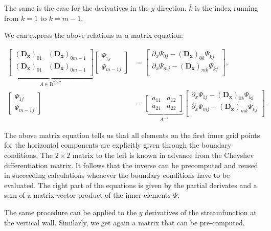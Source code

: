 The same is the case for the derivatives in the $y$ direction. $\bar{k}$ is the
index running from $k=1$ to $k=m-1$.

We can express the above relations as a matrix equation:

\begin{align}
\underbrace{\begin{bmatrix} (\mathbf{D_x})_{01} & (\mathbf{D_x})_{0m-1} \\
    (\mathbf{D_x})_{01} & (\mathbf{D_x})_{0m-1} \\
\end{bmatrix}}_{A \in \mathrm{R}^{2 \times 2}}
\begin{bmatrix} \Psi_{1j} \\ \Psi_{m-1j}
\end{bmatrix} &=
\begin{bmatrix}
\partial_x\Psi_{0j} - (\mathbf{D_x})_{0\bar{k}}\Psi_{\bar{k}j} \\
\partial_x\Psi_{mj} - (\mathbf{D_x})_{m\bar{k}}\Psi_{\bar{k}j} \\
\end{bmatrix}, \nonumber \\
\begin{bmatrix} \Psi_{1j} \\ \Psi_{m-1j}
\end{bmatrix} &=
\underbrace{\begin{bmatrix} a_{11} & a_{12} \\ a_{21} & a_{22} 
\end{bmatrix}}_{A^{-1}}
\begin{bmatrix}
\partial_x\Psi_{1j} - (\mathbf{D_x})_{0\bar{k}}\Psi_{\bar{k}j} \\
\partial_x\Psi_{mj} - (\mathbf{D_x})_{m\bar{k}}\Psi_{\bar{k}j} \\
\end{bmatrix}.
\label{eq:mat1}
\end{align}

The above matrix equation tells us that all elements on the first inner grid
points for the horizontal components are explicitly given through the boundary
conditions. The $2 \times 2$ matrix to the left is known in advance from the
Cheyshev differentiation matrix. It follows that the inverse can be precomputed
and reused in succeeding calculations whenever the boundary conditions have to
be evaluated. The right part of the equations is given by the partial derivates
and a sum of a matrix-vector product of the inner elements $\Psi$.

The same procedure can be applied to the $y$ derivatives of the streamfunction
at the vertical wall. Similarly, we get again a matrix that can be pre-computed. 

